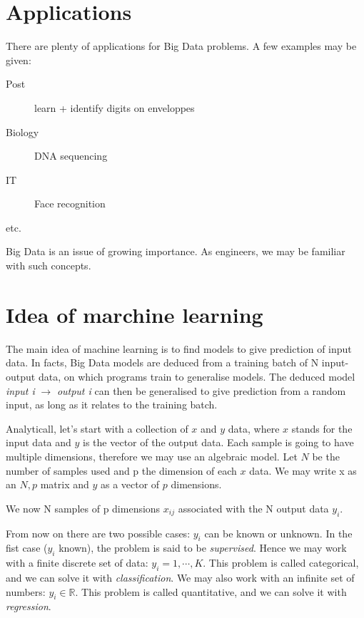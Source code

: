 \documentclass[a4paper]{tufte-book}
\begin{document}
\section*{Applications}

There are plenty of applications for Big Data problems. A few examples may be given:
\begin{description}
    \item[Post] learn + identify digits on enveloppes
    \item[Biology] DNA sequencing
    \item[IT] Face recognition
    \item[etc.]
\end{description}

Big Data is an issue of growing importance. As engineers, we may be familiar with such concepts.
\section*{Idea of marchine learning} 

The main idea of machine learning is to find models to give prediction of input data.
In facts, Big Data models are deduced from a training batch of N input-output
data, on which programs train to generalise models.
The deduced model \emph{input i} $\rightarrow$ \emph{output i} can then be
generalised to give prediction from a random input, as long as it relates to 
the training batch.



Analyticall, let's start with a collection of $x$ and $y$ data, where $x$ stands
for the input data and $y$ is the vector of the output data.
Each sample is going to have multiple dimensions, therefore we may use an
algebraic model. Let $N$ be the number of samples used and p the dimension of
each $x$ data. We may write x as an $N,p$ matrix and $y$ as a vector of $p$
dimensions.

We now N samples of p dimensions $x_{ij}$ associated with the N output data $y_i$.

From now on there are two possible cases: $y_i$ can be known or unknown.
In the fist case ($y_i$ known), the problem is said to be \emph{supervised}.
Hence we may work with a finite discrete set of data: $y_i = 1, \cdots, K$.
This problem is called categorical, and we can solve it with 
\emph{classification}.
We may also work with an infinite set of numbers: $y_i \in \mathbb{R}$. This
problem is called quantitative, and we can solve it with \emph{regression}.
\end{document}
